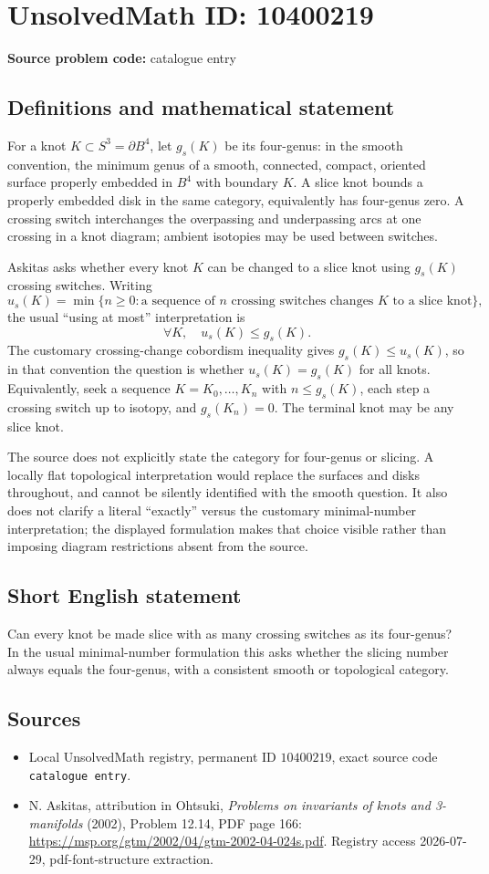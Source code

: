 \documentclass[11pt]{article}
\begin{document}
\section*{UnsolvedMath ID: 10400219}
\textbf{Source problem code:} catalogue entry
\subsection{Definitions and mathematical statement}
For a knot \(K\subset S^3=\partial B^4\), let \(g_s(K)\) be its four-genus: in the smooth convention, the minimum genus of a smooth, connected, compact, oriented surface properly embedded in \(B^4\) with boundary \(K\). A slice knot bounds a properly embedded disk in the same category, equivalently has four-genus zero. A crossing switch interchanges the overpassing and underpassing arcs at one crossing in a knot diagram; ambient isotopies may be used between switches.

Askitas asks whether every knot \(K\) can be changed to a slice knot using \(g_s(K)\) crossing switches. Writing
\[u_s(K)=\min\{n\geq0:\text{a sequence of }n\text{ crossing switches changes }K\text{ to a slice knot}\},\]
the usual ``using at most'' interpretation is
\[\forall K,\quad u_s(K)\leq g_s(K).\]
The customary crossing-change cobordism inequality gives \(g_s(K)\leq u_s(K)\), so in that convention the question is whether \(u_s(K)=g_s(K)\) for all knots. Equivalently, seek a sequence \(K=K_0,\ldots,K_n\) with \(n\leq g_s(K)\), each step a crossing switch up to isotopy, and \(g_s(K_n)=0\). The terminal knot may be any slice knot.

The source does not explicitly state the category for four-genus or slicing. A locally flat topological interpretation would replace the surfaces and disks throughout, and cannot be silently identified with the smooth question. It also does not clarify a literal ``exactly'' versus the customary minimal-number interpretation; the displayed formulation makes that choice visible rather than imposing diagram restrictions absent from the source.
\subsection{Short English statement}
Can every knot be made slice with as many crossing switches as its four-genus? In the usual minimal-number formulation this asks whether the slicing number always equals the four-genus, with a consistent smooth or topological category.
\subsection{Sources}
\begin{itemize}
\item Local UnsolvedMath registry, permanent ID \(10400219\), exact source code \texttt{catalogue entry}.
\item N. Askitas, attribution in Ohtsuki, \emph{Problems on invariants of knots and 3-manifolds} (2002), Problem 12.14, PDF page 166: \url{https://msp.org/gtm/2002/04/gtm-2002-04-024s.pdf}. Registry access 2026-07-29, pdf-font-structure extraction.
\end{itemize}
\end{document}
